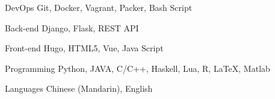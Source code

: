 

\begin{cvskills}

  \cvskill
    {DevOps} %
    {Git, Docker, Vagrant, Packer, Bash Script} %

  \cvskill
    {Back-end} %
    {Django, Flask, REST API} %

  \cvskill
    {Front-end} %
    {Hugo, HTML5, Vue, Java Script} %

  \cvskill
    {Programming} %
    {Python, JAVA, C/C++, Haskell, Lua, R, LaTeX, Matlab} %

  \cvskill
    {Languages} %
    {Chinese (Mandarin), English} %

\end{cvskills}
